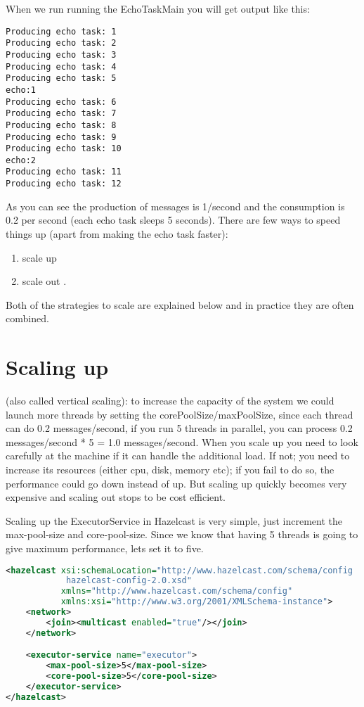 When we run running the EchoTaskMain you will get output like this:
\begin{verbatim}
Producing echo task: 1
Producing echo task: 2
Producing echo task: 3
Producing echo task: 4
Producing echo task: 5
echo:1
Producing echo task: 6
Producing echo task: 7
Producing echo task: 8
Producing echo task: 9
Producing echo task: 10
echo:2
Producing echo task: 11
Producing echo task: 12	
\end{verbatim}

As you can see the production of messages is 1/second and the consumption is 0.2 per second (each echo task sleeps 5 seconds). There are few ways to speed things up (apart from making the echo task faster):
\begin{enumerate}
\item scale up 
\item scale out .
\end{enumerate}
Both of the strategies to scale are explained below and in practice they are often combined. 

\section{Scaling up}
(also called vertical scaling): to increase the capacity of the system we could launch more threads by setting the corePoolSize/maxPoolSize, since each thread can do 0.2 messages/second, if you run 5 threads in parallel, you can process 0.2 messages/second * 5 = 1.0 messages/second. When you scale up you need to look carefully at the machine if it can handle the additional load. If not; you need to increase its resources (either cpu, disk, memory etc); if you fail to do so, the performance could go down instead of up. But scaling up quickly becomes very expensive and scaling out stops to be cost efficient. 

Scaling up the ExecutorService in Hazelcast is very simple, just increment the max-pool-size and core-pool-size. Since we know that having 5 threads is going to give maximum performance, lets set it to five.
\begin{lstlisting}[language=xml]
<hazelcast xsi:schemaLocation="http://www.hazelcast.com/schema/config
            hazelcast-config-2.0.xsd"
           xmlns="http://www.hazelcast.com/schema/config"
           xmlns:xsi="http://www.w3.org/2001/XMLSchema-instance">
    <network>
        <join><multicast enabled="true"/></join>
    </network>

    <executor-service name="executor">
        <max-pool-size>5</max-pool-size>
        <core-pool-size>5</core-pool-size>
    </executor-service>
</hazelcast>
\end{lstlisting}

